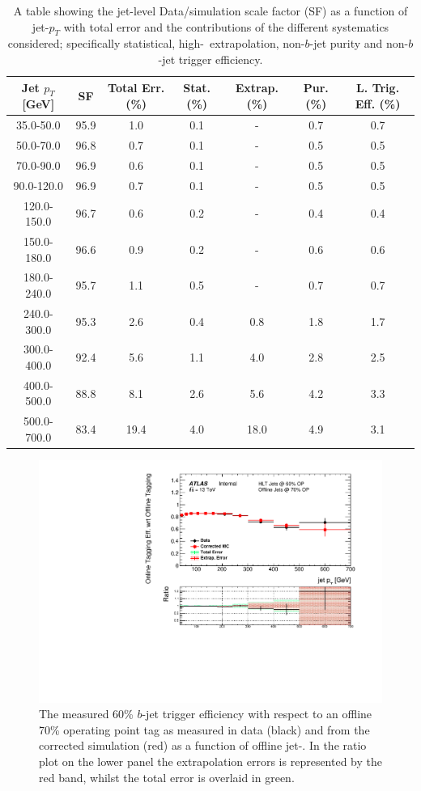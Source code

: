 \begin{table}[!ht]
  \begin{tabular}{|c||c|c||c|c|c|c|}
    \hline
    Jet $p_T$ [GeV] & SF & Total Err. (\%) & Stat. (\%) & Extrap. (\%) & Pur. (\%) & L. Trig. Eff. (\%)\\
    \hline
    35.0-50.0 & 95.9 & 1.0 & 0.1 & - & 0.7 & 0.7\\
    50.0-70.0 & 96.8 & 0.7 & 0.1 & - & 0.5 & 0.5\\
    70.0-90.0 & 96.9 & 0.6 & 0.1 & - & 0.5 & 0.5\\
    90.0-120.0 & 96.9 & 0.7 & 0.1 & - & 0.5 & 0.5\\
    120.0-150.0 & 96.7 & 0.6 & 0.2 & - & 0.4 & 0.4\\
    150.0-180.0 & 96.6 & 0.9 & 0.2 & - & 0.6 & 0.6\\
    180.0-240.0 & 95.7 & 1.1 & 0.5 & - & 0.7 & 0.7\\
    \hline
    240.0-300.0 & 95.3 & 2.6 & 0.4 & 0.8 & 1.8 & 1.7\\
    300.0-400.0 & 92.4 & 5.6 & 1.1 & 4.0 & 2.8 & 2.5\\
    400.0-500.0 & 88.8 & 8.1 & 2.6 & 5.6 & 4.2 & 3.3\\
    500.0-700.0 & 83.4 & 19.4 & 4.0 & 18.0 & 4.9 & 3.1\\
    \hline
\end{tabular}
  \caption{A table showing the jet-level Data/simulation scale factor (SF) as a function of jet-$p_{T}$
    with total error and the contributions of the different systematics considered;
    specifically statistical, high-\pT~extrapolation, non-$b$-jet purity and non-$b$-jet trigger efficiency.}
\label{tab:bTrig_jetSys}
\end{table}

\begin{figure}[!ht]
  \begin{center}
    \includegraphics[width=0.8\linewidth, angle=0]{figs/Trigger/fullSys_EfficiencyComp_jetPt.eps}
  \end{center}
  \caption{
    The measured 60\% $b$-jet trigger efficiency with respect to an offline 70\% operating point tag
    as measured in data (black) and from the corrected simulation (red) as a function of offline jet-\pT.
    In the ratio plot on the lower panel the extrapolation errors is represented by the red band, whilst the total error is overlaid in green.
    \label{fig:bTrig_jetSys_effComp}
  }
\end{figure}

